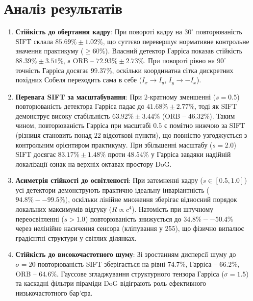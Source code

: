 \documentclass[14pt, a4paper]{extarticle}
\begin{document}
\section{Аналіз результатів}
\begin{enumerate}
    \item \textbf{Стійкість до обертання кадру}:
    При повороті кадру на $30^\circ$ повторюваність SIFT склала $85.69\% \pm 1.02\%$, що суттєво перевершує нормативне контрольне значення практикуму ($\ge 60\%$). Власний детектор Гарріса показав стійкість $88.39\% \pm 3.51\%$, а ORB -- $72.93\% \pm 2.73\%$. При повороті рівно на $90^\circ$ точність Гарріса досягає $99.37\%$, оскільки координатна сітка дискретних похідних Собеля переходить сама в себе ($I_x \to I_y$, $I_y \to -I_x$).

    \item \textbf{Перевага SIFT за масштабування}:
    При 2-кратному зменшенні ($s=0.5$) повторюваність детектора Гарріса падає до $41.68\% \pm 2.77\%$, тоді як SIFT демонструє високу стабільність $63.92\% \pm 3.44\%$ (ORB -- $46.32\%$). Таким чином, повторюваність Гарріса при масштабі $0.5$ є помітно нижчою за SIFT (різниця становить понад $22$ відсоткові пункти), що повністю узгоджується з контрольним орієнтиром практикуму. При збільшенні масштабу ($s=2.0$) SIFT досягає $83.17\% \pm 1.48\%$ проти $48.54\%$ у Гарріса завдяки надійній локалізації ознак на верхніх октавах простору DoG.

    \item \textbf{Асиметрія стійкості до освітленості}:
    При затемненні кадру ($s \in [0.5, 1.0]$) усі детектори демонструють практично ідеальну інваріантність ($94.8\%--99.5\%$), оскільки лінійне множення зберігає відносний порядок локальних максимумів відгуку ($R \propto c^4$). Натомість при штучному переосвітленні ($s > 1.0$) повторюваність знижується до $34.8\%--50.4\%$ через нелінійне насичення сенсора (кліпування у 255), що фізично випалює градієнтні структури у світлих ділянках.

    \item \textbf{Стійкість до високочастотного шуму}:
    Зі зростанням дисперсії шуму до $\sigma = 20$ повторюваність SIFT зберігається на рівні $74.7\%$, Гарріса -- $66.2\%$, ORB -- $64.6\%$. Гауссове згладжування структурного тензора Гарріса ($\sigma=1.5$) та каскадні фільтри піраміди DoG відіграють роль ефективного низькочастотного бар'єра.
\end{enumerate}
\end{document}
